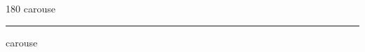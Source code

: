 
\begin{frame}
\begin{center}
\begin{turn}{180}
{\fontsize{2.5cm}{1em}\selectfont carouse}
\end{turn}
\vspace{1em}\par  
\hrule
\vspace{1em}\par  
{\fontsize{2.5cm}{1em}\selectfont carouse}
\end{center}
\end{frame}
